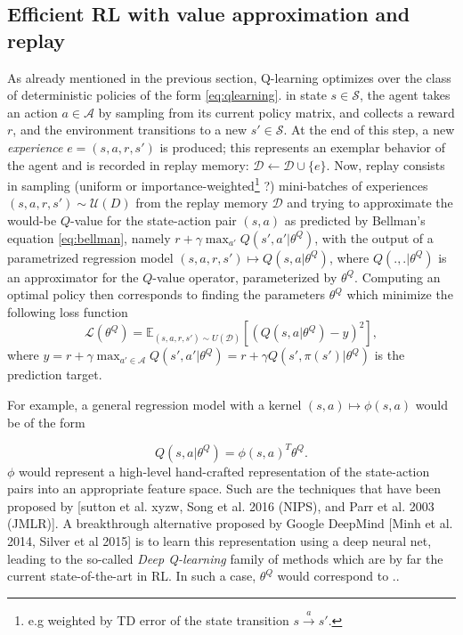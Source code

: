 \documentclass{article} %
\begin{document}
\subsection{Efficient RL with value approximation and replay}
As already mentioned in the previous section, Q-learning optimizes over the class of
deterministic policies of the form \eqref{eq:qlearning}.
in state $s \in \mathcal S$, the agent takes an action $a \in \mathcal A$
by sampling from its current policy matrix, and collects a reward $r$,
and the environment transitions to a new $s' \in \mathcal S$. At the end of
this step, a new \textit{experience} $e = (s,a,r,s')$ is produced; this represents an exemplar behavior of the agent and is recorded in replay memory:
$\mathcal D \leftarrow \mathcal D \cup \{e\}$.
Now, replay consists in sampling (uniform or importance-weighted\footnote{e.g weighted by TD error of the state transition $s \overset{a}{\rightarrow} s'$.} ?)  mini-batches of experiences
$(s, a, r, s') \sim \mathcal U(D)$ from the replay memory $\mathcal D$ and trying to
approximate
the would-be $Q$-value for the state-action pair $(s,a)$ as predicted by Bellman's equation \eqref{eq:bellman}, namely
$r + \gamma \max_{a'} Q(s', a'|\theta^Q)$, with the output of a parametrized regression model $(s,a,r,s') \mapsto {Q}(s, a|\theta^Q)$, where $Q(.,.|\theta^Q)$ is an approximator for the $Q$-value operator,  parameterized by $\theta^Q$. Computing an optimal policy then corresponds to finding the parameters $\theta^Q$ which minimize the following loss function
\begin{equation}
  \mathcal L(\theta^Q)
  = \mathbb E_{(s, a, r, s') \sim U(\mathcal D)}[(Q(s, a|\theta^Q) - y)^2],
  \label{eq:oracle}
  \end{equation}
where
$ y = r + \gamma \max_{a' \in \mathcal A} Q(s', a'|\theta^Q) = r + \gamma Q(s', \pi(s')|\theta^Q)$ is the prediction target.

For example, a general regression model with a kernel $(s, a) \mapsto \phi(s, a)$ would be of the
form

$${Q}(s, a|\theta^Q) = \phi(s,a)^T\theta^Q.$$
$\phi$ would represent a high-level hand-crafted representation of the state-action pairs into an appropriate feature space. Such are the techniques that have been proposed by [sutton et al. xyzw, Song et al. 2016 (NIPS), and Parr et al. 2003 (JMLR)].
A breakthrough alternative proposed by Google DeepMind [Minh et al. 2014, Silver et al 2015] is to learn this representation using a deep neural net, leading to the so-called \textit{Deep Q-learning} family of methods which are by far the current state-of-the-art in RL. In such a case, $\theta^Q$ would correspond to ..
\end{document}
